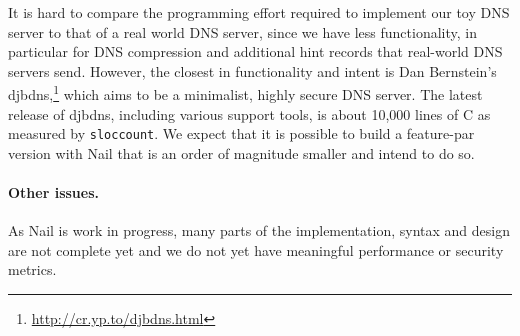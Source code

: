 It is hard to compare the programming effort required to implement
our toy DNS server to that of a real world DNS server, since
we have less functionality, in particular for DNS compression
and additional hint records that real-world DNS servers send.
However, the closest in functionality and intent is Dan Bernstein's
djbdns,\footnote{\url{http://cr.yp.to/djbdns.html}} which aims to be
a minimalist, highly secure DNS server. The latest release of djbdns,
including various support tools, is about 10,000 lines of C as measured by
\texttt{sloccount}.  We expect that it is possible to build a feature-par
version with Nail that is an order of magnitude smaller and intend to
do so.


\paragraph{Other issues.}

As Nail is work in progress, many parts of the implementation, syntax and
design are not complete yet and we do not yet have meaningful performance
or security metrics.

